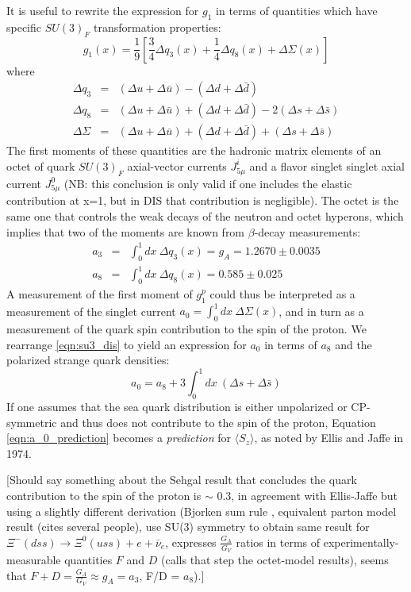 It is useful to rewrite the expression for $g_1$ in terms of quantities which have specific $SU(3)_F$ transformation properties:
%
\begin{equation}
  g_1(x) = \frac{1}{9}[\frac{3}{4}\Delta q_3(x) + \frac{1}{4}\Delta q_8(x) + \Delta \Sigma(x)]
\end{equation}
%
where
%
\begin{eqnarray}
  \Delta q_3 & = & (\Delta u + \Delta \bar{u}) - (\Delta d + \Delta \bar{d}) \nonumber \\
  \Delta q_8 & = & (\Delta u + \Delta \bar{u}) + (\Delta d + \Delta \bar{d}) - 2(\Delta s + \Delta \bar{s}) \nonumber \\
  \Delta \Sigma & = & (\Delta u + \Delta \bar{u}) + (\Delta d + \Delta \bar{d}) + (\Delta s + \Delta \bar{s})
  \label{eqn:su3_dis}
\end{eqnarray}
%
The first moments of these quantities are the hadronic matrix elements of an octet of quark $SU(3)_F$ axial-vector currents $J_{5\mu}^i$ and a flavor singlet singlet axial current $J_{5\mu}^0$ (NB: this conclusion is only valid if one includes the elastic contribution at x=1, but in DIS that contribution is negligible).  The octet is the same one that controls the weak decays of the neutron and octet hyperons, which implies that two of the moments are known from $\beta$-decay measurements:
%
\begin{eqnarray}
  a_3 & = & \int_0^1 dx~\Delta q_3(x) = g_A = 1.2670 \pm 0.0035 \nonumber \\
  a_8 & = & \int_0^1 dx~\Delta q_8(x) = 0.585 \pm 0.025
\end{eqnarray}
%
A measurement of the first moment of $g_1^p$ could thus be interpreted as a measurement of the singlet current $a_0 = \int_0^1 dx~\Delta \Sigma (x)$, and in turn as a measurement of the quark spin contribution to the spin of the proton.  We rearrange \ref{eqn:su3_dis} to yield an expression for $a_0$ in terms of $a_8$ and the polarized strange quark densities:
%
\begin{equation}
  a_0 = a_8 + 3 \int_0^1 dx~(\Delta s + \Delta \bar s)
  \label{eqn:a_0_prediction}
\end{equation}
%
If one assumes that the sea quark distribution is either unpolarized or CP-symmetric and thus does not contribute to the spin of the proton, Equation \ref{eqn:a_0_prediction} becomes a \textit{prediction} for $\langle S_z \rangle$, as noted by Ellis and Jaffe \cite{Ellis:1973kp} in 1974.

[Should say something about the Sehgal result \cite{Sehgal:1974rz} that concludes the quark contribution to the spin of the proton is $\sim$ 0.3, in agreement with Ellis-Jaffe but using a slightly different derivation (Bjorken sum rule \cite{Bjorken:1966jh}, equivalent parton model result (cites several people), use SU(3) symmetry to obtain same result for $\Xi^- (dss) \rightarrow \Xi^0 (uss) + e + \bar \nu_e$, expresses $\frac{G_A}{G_V}$ ratios in terms of experimentally-measurable quantities $F$ and $D$ (calls that step the octet-model results), seems that $F+D = \frac{G_A}{G_V} \approx g_A = a_3$, F/D = $a_8$).]

